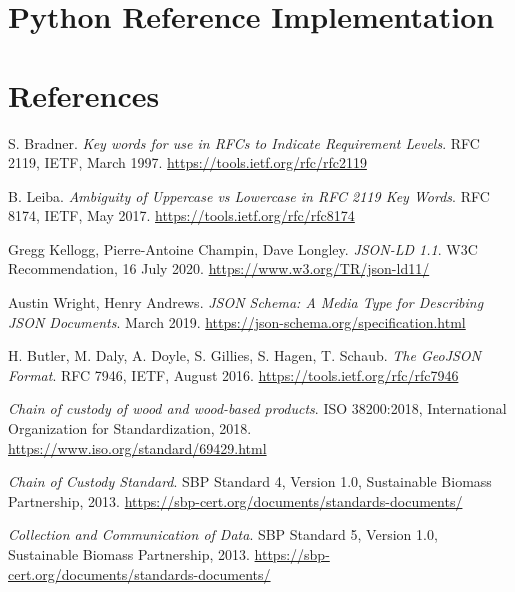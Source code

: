 \documentclass{article}
\begin{document}
\section{Python Reference Implementation}
\label{app:python-implementation}



\newpage
\section*{References}

\begin{thebibliography}{99}

S. Bradner. \textit{Key words for use in RFCs to Indicate Requirement Levels}. RFC 2119, IETF, March 1997. 
\url{https://tools.ietf.org/rfc/rfc2119}

B. Leiba. \textit{Ambiguity of Uppercase vs Lowercase in RFC 2119 Key Words}. RFC 8174, IETF, May 2017.
\url{https://tools.ietf.org/rfc/rfc8174}

Gregg Kellogg, Pierre-Antoine Champin, Dave Longley. \textit{JSON-LD 1.1}. W3C Recommendation, 16 July 2020.
\url{https://www.w3.org/TR/json-ld11/}

Austin Wright, Henry Andrews. \textit{JSON Schema: A Media Type for Describing JSON Documents}. March 2019.
\url{https://json-schema.org/specification.html}

H. Butler, M. Daly, A. Doyle, S. Gillies, S. Hagen, T. Schaub. \textit{The GeoJSON Format}. RFC 7946, IETF, August 2016.
\url{https://tools.ietf.org/rfc/rfc7946}

\textit{Chain of custody of wood and wood-based products}. ISO 38200:2018, International Organization for Standardization, 2018.
\url{https://www.iso.org/standard/69429.html}

\textit{Chain of Custody Standard}. SBP Standard 4, Version 1.0, Sustainable Biomass Partnership, 2013.
\url{https://sbp-cert.org/documents/standards-documents/}

\textit{Collection and Communication of Data}. SBP Standard 5, Version 1.0, Sustainable Biomass Partnership, 2013.
\url{https://sbp-cert.org/documents/standards-documents/}


\end{thebibliography}
\end{document}
